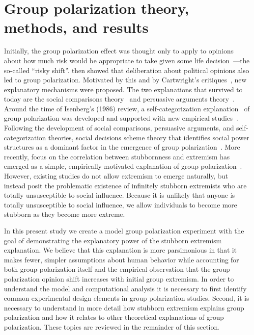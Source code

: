 \section{Group polarization theory, methods, and results}

Initially, the group polarization effect was thought only to apply to opinions about how much
risk would be appropriate to take given some life 
decision~\cite{Wallach1965,Teger1967,Stoner1968}---the so-called ``risky shift''. 
 then showed that deliberation about political opinions also led to group 
polarization. Motivated by this and by Cartwright's critiques~\cite{Cartwright1971,Cartwright1973},
new explanatory mechanisms were proposed. The two explanations that survived to today 
are the social comparisons theory~\cite{Brown1974,Sanders1977,Myers1978} 
and persuasive arguments theory~\cite{Burnstein1973,Vinokur1974,Burnstein1975}. 
Around the time of Isenberg's
(1986) review, a self-categorization explanation~\cite{Turner1987} of
group polarization was developed and supported with new empirical 
studies~\cite{Turner1989,Abrams1990,Hogg1990,McGarty1992,Krizan2007}. 
Following the development of social comparisons, persuasive arguments, and
self-categorization theories, 
social decisions scheme theory that identifies social power structures
as a dominant factor in the emergence of group polarization~\cite{Zuber1992,Friedkin1999a}. 
More recently, focus on the correlation between stubbornness and extremism has emerged as
a simple, empirically-motivated explanation of group 
polarization~\cite{Mueller2018,Banisch2019}. However, existing studies do not
allow extremism to emerge naturally, but instead posit the problematic existence of
infinitely stubborn extremists who are totally unsusceptible to social influence.
Because it is unlikely that anyone is totally unsusceptible to social influence,
we allow individuals to become more stubborn as they become more extreme.

In this present study we create a model group polarization experiment with the
goal of demonstrating the explanatory power of the stubborn extremism explanation.
We believe that this explanation is more parsimonious in that it makes fewer,
simpler assumptions about human behavior while accounting for both group
polarization itself and the empirical observation that the group polarization
opinion shift increases with initial group extremism. In order to understand
the model and computational analysis it is necessary to first identify 
common experimental design elements in group polarization studies. Second,
it is necessary to understand in more detail how stubborn extremism explains
group polarization and how it relates to other theoretical explanations of
group polarization. These topics are reviewed in the remainder of this section.

